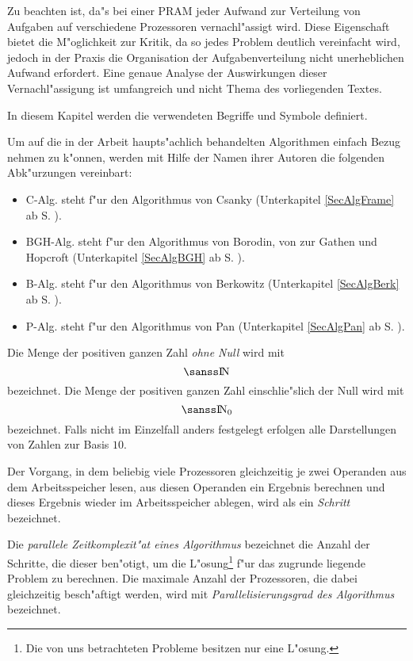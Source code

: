 Zu beachten ist, da"s bei einer PRAM jeder Aufwand zur Verteilung von
Aufgaben auf verschiedene Prozessoren vernachl"assigt wird. Diese 
Eigenschaft bietet die M"oglichkeit zur Kritik, da so jedes
Problem deutlich vereinfacht wird, jedoch in der Praxis die Organisation der 
Aufgabenverteilung nicht unerheblichen Aufwand erfordert.
Eine genaue Analyse der 
Auswirkungen dieser Vernachl"assigung ist umfangreich und nicht 
Thema des vorliegenden Textes.


\label{SecBez}

In diesem Kapitel werden die verwendeten Begriffe und Symbole 
definiert.

Um auf die in der Arbeit haupts"achlich behandelten Algorithmen 
einfach Bezug
nehmen zu k"onnen, werden mit Hilfe der Namen ihrer Autoren die
folgenden Abk"urzungen vereinbart:
\begin{itemize}
\item
      C-Alg. steht f"ur den Algorithmus von Csanky 
      (Unterkapitel \ref{SecAlgFrame} ab S. \pageref{SecAlgFrame}).
\item
      BGH-Alg. steht f"ur den Algorithmus von Borodin, von zur Gathen 
      und Hopcroft (Unterkapitel \ref{SecAlgBGH} ab 
      S. \pageref{SecAlgBGH}).
\item
      B-Alg. steht f"ur den Algorithmus von Berkowitz 
      (Unterkapitel \ref{SecAlgBerk} ab S. \pageref{SecAlgBerk}).
\item
      P-Alg. steht f"ur den Algorithmus von Pan
      (Unterkapitel \ref{SecAlgPan} ab S. \pageref{SecAlgPan}).
\end{itemize}

Die Menge der positiven ganzen Zahl {\em ohne Null} wird mit \[ \Nat \]
bezeichnet. Die Menge der
positiven ganzen Zahl einschlie"slich der Null wird mit \[ \Nat_0 \]
bezeichnet. Falls nicht im Einzelfall anders festgelegt erfolgen alle
Darstellungen von Zahlen zur Basis $10$.

Der Vorgang, in dem beliebig viele Prozessoren gleichzeitig je
zwei Operanden aus dem Arbeitsspeicher lesen, aus diesen Operanden
ein Ergebnis berechnen und dieses Ergebnis wieder im
Arbeitsspeicher ablegen, wird als ein {\em Schritt} bezeichnet.

Die {\em parallele Zeitkomplexit"at eines Algorithmus} bezeichnet die
Anzahl der Schritte, die dieser ben"otigt, um die L"osung\footnote{Die
von uns betrachteten Probleme besitzen nur eine L"osung.}
f"ur das
zugrunde liegende Problem zu berechnen.
Die maximale Anzahl der Prozessoren, die dabei gleichzeitig
besch"aftigt werden, wird mit {\em Parallelisierungsgrad des
Algorithmus} bezeichnet.

